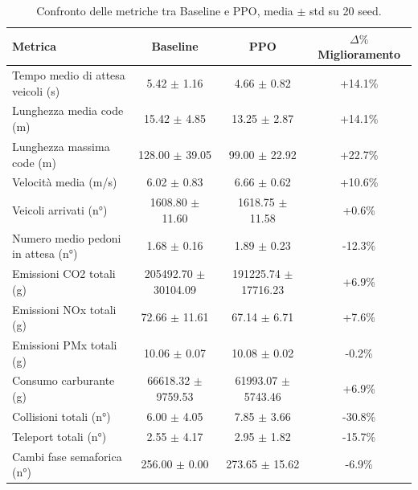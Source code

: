 \begin{table}[ht]
\centering
\caption{Confronto delle metriche tra Baseline e PPO, media $\pm$ std su 20 seed.}
\label{tab:final_comparison}
\begin{tabular}{lccc}
\toprule
\textbf{Metrica} & \textbf{Baseline} & \textbf{PPO} & \textbf{$\Delta\%$ Miglioramento} \\
\midrule
Tempo medio di attesa veicoli (s) & 5.42 $\pm$ 1.16 & 4.66 $\pm$ 0.82 & +14.1\% \\
Lunghezza media code (m) & 15.42 $\pm$ 4.85 & 13.25 $\pm$ 2.87 & +14.1\% \\
Lunghezza massima code (m) & 128.00 $\pm$ 39.05 & 99.00 $\pm$ 22.92 & +22.7\% \\
Velocità media (m/s) & 6.02 $\pm$ 0.83 & 6.66 $\pm$ 0.62 & +10.6\% \\
Veicoli arrivati (n°) & 1608.80 $\pm$ 11.60 & 1618.75 $\pm$ 11.58 & +0.6\% \\
Numero medio pedoni in attesa (n°) & 1.68 $\pm$ 0.16 & 1.89 $\pm$ 0.23 & -12.3\% \\
Emissioni CO2 totali (g) & 205492.70 $\pm$ 30104.09 & 191225.74 $\pm$ 17716.23 & +6.9\% \\
Emissioni NOx totali (g) & 72.66 $\pm$ 11.61 & 67.14 $\pm$ 6.71 & +7.6\% \\
Emissioni PMx totali (g) & 10.06 $\pm$ 0.07 & 10.08 $\pm$ 0.02 & -0.2\% \\
Consumo carburante (g) & 66618.32 $\pm$ 9759.53 & 61993.07 $\pm$ 5743.46 & +6.9\% \\
Collisioni totali (n°) & 6.00 $\pm$ 4.05 & 7.85 $\pm$ 3.66 & -30.8\% \\
Teleport totali (n°) & 2.55 $\pm$ 4.17 & 2.95 $\pm$ 1.82 & -15.7\% \\
Cambi fase semaforica (n°) & 256.00 $\pm$ 0.00 & 273.65 $\pm$ 15.62 & -6.9\% \\
\bottomrule
\end{tabular}
\end{table}